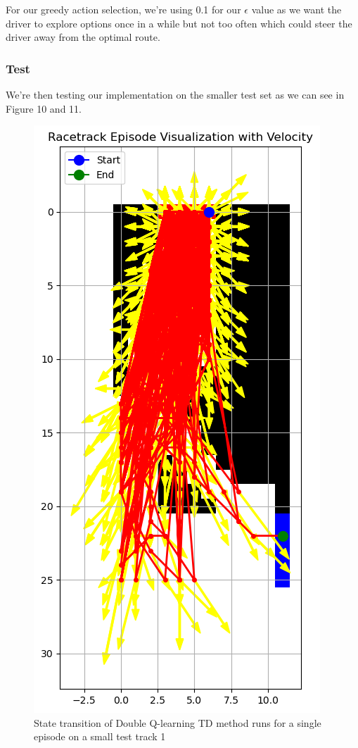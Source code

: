 \documentclass{article}
\begin{document}
For our greedy action selection, we're using 0.1 for our $\epsilon$ value as we
want the driver to explore options once in a while but not too often which could
steer the driver away from the optimal route.

\subsubsection{Test}
We're then testing our implementation on the smaller test set as we can see in
Figure 10 and 11.

\begin{figure}[h!]
\centering
\includegraphics[scale=0.5]{./images/q-td-learning-test-track1.png}
\caption{State transition of Double Q-learning TD method runs for a single episode on a small test track 1}
\label{fig:q-td-learning-test-track1}
\end{figure}
\end{document}
